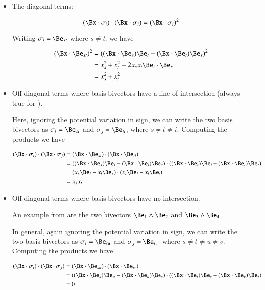\documentclass{article}      %
\begin{document}
\begin{itemize}
\item The diagonal terms:

\[
(\Bx \cdot \sigma_i) \cdot (\Bx \cdot \sigma_i) 
= (\Bx \cdot \sigma_i)^2
\]

Writing $\sigma_i = \Be_{st}$ where $s \ne t$, we have

\begin{align*}
(\Bx \cdot \Be_{st})^2
&=
( (\Bx \cdot \Be_s) \Be_t -(\Bx \cdot \Be_t) \Be_s )^2 \\
&=
x_s^2 + x_t^2 - 2 x_s x_t \Be_t \cdot \Be_s \\
&=
x_s^2 + x_t^2
\end{align*}

\item Off diagonal terms where basis bivectors have a line of intersection (always true for ).

Here, ignoring the potential variation in sign, we can write the two basis bivectors as $\sigma_i = \Be_{si}$ and $\sigma_j = \Be_{ti}$, where $s \ne t \ne i$.  Computing the products we have

\begin{align*}
(\Bx \cdot \sigma_i) \cdot (\Bx \cdot \sigma_j)
&= (\Bx \cdot \Be_{si}) \cdot (\Bx \cdot \Be_{ti})  \\
&= ((\Bx \cdot \Be_s) \Be_i - (\Bx \cdot \Be_i) \Be_s) \cdot ((\Bx \cdot \Be_t) \Be_i - (\Bx \cdot \Be_i) \Be_t) \\
&= (x_s \Be_i - x_i \Be_s) \cdot (x_t \Be_i - x_i \Be_t) \\
&= x_s x_t \\
\end{align*}

\item Off diagonal terms where basis bivectors have no intersection.

An example from  are the two bivectors $\Be_1 \wedge \Be_2$ and $\Be_3 \wedge \Be_4$

In general, again ignoring the potential variation in sign, we can write the two basis bivectors as $\sigma_i = \Be_{su}$ and $\sigma_j = \Be_{tv}$, where $s \ne t \ne u \ne v$.  Computing the products we have

\begin{align*}
(\Bx \cdot \sigma_i) \cdot (\Bx \cdot \sigma_j)
&= (\Bx \cdot \Be_{su}) \cdot (\Bx \cdot \Be_{tv})  \\
&= ((\Bx \cdot \Be_s) \Be_u - (\Bx \cdot \Be_u) \Be_s) \cdot ((\Bx \cdot \Be_t) \Be_v - (\Bx \cdot \Be_v) \Be_t) \\
&= 0 \\
\end{align*}

\end{itemize}
\end{document}
